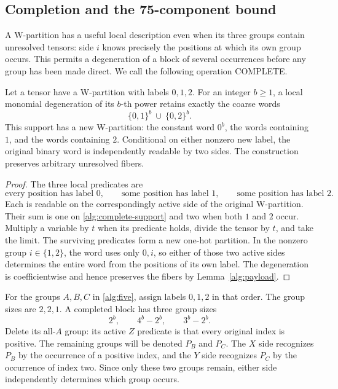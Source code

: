\subsection{Completion and the 75-component bound}
\label{alg:completion-section}

A W-partition has a useful local description even when its three groups
contain unresolved tensors: side \(i\) knows precisely the positions at
which its own group occurs.  This permits a degeneration of a block of
several occurrences before any group has been made direct.  We call the
following operation COMPLETE.

\begin{lemma}[Completion]
\label{alg:completion}
Let a tensor have a W-partition with labels \(0,1,2\).  For an integer
\(b\geq1\), a local monomial degeneration of its \(b\)-th power retains
exactly the coarse words
\begin{equation}
 \{0,1\}^b\ \cup\ \{0,2\}^b.
 \label{alg:complete-support}
\end{equation}
This support has a new W-partition: the constant word \(0^b\), the words
containing \(1\), and the words containing \(2\).  Conditional on either
nonzero new label, the original binary word is independently readable by
two sides.  The construction preserves arbitrary unresolved fibers.
\end{lemma}
\begin{proof}
The three local predicates are
\[
 \text{every position has label }0,\qquad
 \text{some position has label }1,\qquad
 \text{some position has label }2.
\]
Each is readable on the correspondingly active side of the original
W-partition.  Their sum is one on \eqref{alg:complete-support} and two
when both \(1\) and \(2\) occur.  Multiply a variable by \(t\) when its
predicate holds, divide the tensor by \(t\), and take the limit.  The
surviving predicates form a new one-hot partition.  In the nonzero group
\(i\in\{1,2\}\), the word uses only \(0,i\), so either of those two
active sides determines the entire word from the positions of its own
label.  The degeneration is coefficientwise and hence preserves the fibers
by Lemma~\ref{alg:payload}.
\end{proof}

For the groups \(A,B,C\) in \eqref{alg:five}, assign labels \(0,1,2\)
in that order.  The group sizes are \(2,2,1\).  A completed block has
three group sizes
\[
 2^b,\qquad4^b-2^b,\qquad3^b-2^b.
\]
Delete its all-\(A\) group: its active \(Z\) predicate is that every
original index is positive.  The remaining groups will be denoted
\(P_B\) and \(P_C\).  The \(X\) side recognizes \(P_B\) by the
occurrence of a positive index, and the \(Y\) side recognizes \(P_C\)
by the occurrence of index two.  Since only these two groups remain,
either side independently determines which group occurs.

